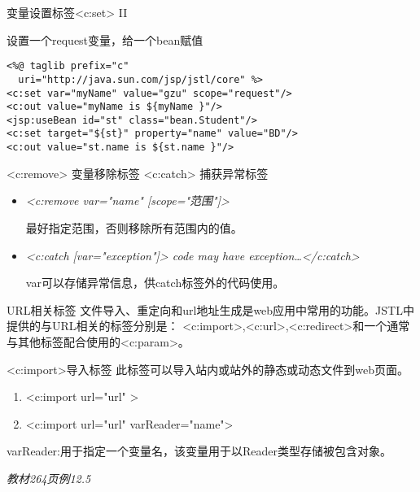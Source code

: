 \documentclass{beamer}
\begin{document}
\begin{frame}[fragile]{变量设置标签<c:set> II}
\begin{block}{设置一个request变量，给一个bean赋值}
\begin{lstlisting}
<%@ taglib prefix="c" 
  uri="http://java.sun.com/jsp/jstl/core" %>
<c:set var="myName" value="gzu" scope="request"/>
<c:out value="myName is ${myName }"/>
<jsp:useBean id="st" class="bean.Student"/>
<c:set target="${st}" property="name" value="BD"/>
<c:out value="st.name is ${st.name }"/>
\end{lstlisting}
\end{block}
\end{frame}
\begin{frame}[fragile]{<c:remove> 变量移除标签 <c:catch> 捕获异常标签}
\begin{itemize}
\item
\emph{<c:remove var="name" [scope="范围"]>}

最好指定范围，否则移除所有范围内的值。
\item
\emph{<c:catch [var="exception"]> code may have exception\ldots </c:catch>}

var可以存储异常信息，供catch标签外的代码使用。
\end{itemize}
\end{frame}
\begin{frame}{URL相关标签}
文件导入、重定向和url地址生成是web应用中常用的功能。JSTL中提供的与URL相关的标签分别是：
<c:import>,<c:url>,<c:redirect>和一个通常与其他标签配合使用的<c:param>。
\end{frame}
\begin{frame}{<c:import>导入标签}
此标签可以导入站内或站外的静态或动态文件到web页面。
\begin{enumerate}
\item
<c:import url="url" >
\item
<c:import url="url" varReader="name">
\end{enumerate}
varReader:用于指定一个变量名，该变量用于以Reader类型存储被包含对象。

\emph{教材264页例12.5}
\end{frame}
\end{document}
